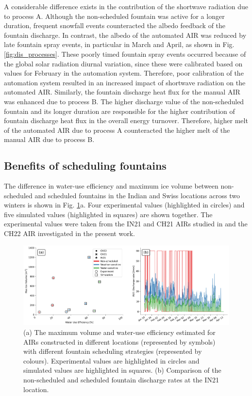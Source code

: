 \documentclass[tc, manuscript]{copernicus}
\begin{document}
A considerable difference exists in the contribution of the shortwave radiation due to process A. Although the
non-scheduled fountain was active for a longer duration, frequent snowfall events counteracted the albedo feedback
of the fountain discharge. In contrast, the albedo of the automated AIR was reduced by late fountain spray
events, in particular in March and April, as shown in Fig. \ref{fig:dis_processes}. These poorly timed fountain
spray events occurred because of the global solar radiation diurnal variation, since these were calibrated based
on values for February in the automation system. Therefore, poor calibration of the automation system resulted
in an increased impact of shortwave radiation on the automated AIR. Similarly, the fountain discharge heat flux
for the manual AIR was enhanced due to process B. The higher discharge value of the non-scheduled fountain and its
longer duration are responsible for the higher contribution of fountain discharge heat flux in the overall
energy turnover. Therefore, higher melt of the automated AIR due to process A counteracted the higher melt of
the manual AIR due to process B.

\subsection{Benefits of scheduling fountains}

The difference in water-use efficiency and maximum ice volume between non-scheduled and scheduled fountains in the Indian and Swiss
locations across two winters is shown in Fig. \ref{fig:wue}a. Four experimental values (highlighted in
circles) and five simulated values (highlighted in squares) are shown together.  The experimental values were
taken from the IN21 and CH21 AIRs studied in \citet{balasubramanianInfluenceMeteorologicalConditions2022} and
the CH22 AIR investigated in the present work. 

\begin{figure}[htb]
\includegraphics[width=\textwidth]{Figures/wue.png}

\caption{(a) The maximum volume and water-use efficiency estimated for AIRs constructed in different locations
(represented by symbols) with different fountain scheduling strategies (represented by colours). Experimental
values are highlighted in circles and simulated values are highlighted in squares. (b) Comparison of
the non-scheduled and scheduled fountain discharge rates at the IN21 location.}

\label{fig:wue}
\end{figure}
\end{document}
